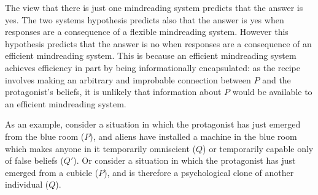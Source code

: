 \documentclass[12pt,\papersize]{extarticle}
\begin{document}
%
The view that there is just one mindreading system predicts that the answer is yes.
The two systems hypothesis predicts also that the answer is yes when responses are a consequence of a flexible mindreading system.
However this hypothesis predicts that the answer is no when responses are a consequence of an efficient mindreading system.
This is because an efficient mindreading system achieves efficiency in part by being informationally encapsulated: as the recipe involves making an arbitrary and improbable connection between $P$ and the protagonist's beliefs, it is unlikely that information about $P$ would be available to an efficient mindreading system.

As an example, consider a situation in which the protagonist has just emerged from the blue room ($P$), and aliens have installed a machine in the blue room which makes anyone in it temporarily omniscient ($Q$) or temporarily capable only of false beliefs ($Q'$).  Or consider a situation in which the protagonist has just emerged from a cubicle ($P$), and is therefore a psychological clone of another individual ($Q$).









\end{document}
